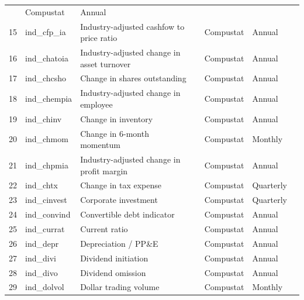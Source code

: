 \documentclass[11pt, a4paper, table]{article}
\begin{document}
\begin{landscape}
\begin{center}
\begin{longtable}{lllllll}
				\cite{desai_value-glamour_2004} & Compustat & Annual \\
			15 & ind\_cfp\_ia\footnotemark[\value{footnote}] & Industry-adjusted cashfow to price ratio & 
				\cite{asness_predicting_2000} & Compustat & Annual \\
			16 & ind\_chatoia\footnotemark[\value{footnote}] & Industry-adjusted change in asset turnover & 
				\cite{soliman_use_2008} & Compustat & Annual \\
			17 & ind\_chcsho & Change in shares outstanding & 
				\cite{pontiff_share_2008} & Compustat & Annual \\
			18 & ind\_chempia & Industry-adjusted change in employee & 
				\cite{asness_predicting_2000} & Compustat & Annual \\
			19 & ind\_chinv\footnotemark[\value{footnote}] & Change in inventory & 
				\cite{thomas_inventory_2002} & Compustat & Annual \\
			20 & ind\_chmom & Change in 6-month momentum & 
				\cite{gettleman_acceleration_2006} & Compustat & Monthly \\
			21 & ind\_chpmia\footnotemark[\value{footnote}] & Industry-adjusted change in profit margin & 
				\cite{soliman_use_2008} & Compustat & Annual \\
			22 & ind\_chtx & Change in tax expense & 
				\cite{thomas_tax_2011} & Compustat & Quarterly \\
			23 & ind\_cinvest & Corporate investment & 
				\cite{titman_capital_2004} & Compustat & Quarterly \\
			24 & ind\_convind & Convertible debt indicator & 
				\cite{valta_strategic_2016} & Compustat & Annual \\
			25 & ind\_currat & Current ratio & 
				\cite{ou_financial_1989} & Compustat & Annual \\
			26 & ind\_depr & Depreciation / PP\&E & 
				\cite{holthausen_prediction_1992} & Compustat & Annual \\
			27 & ind\_divi & Dividend initiation & 
				\cite{michaely_price_1995} & Compustat & Annual \\
			28 & ind\_divo & Dividend omission & 
				\cite{michaely_price_1995} & Compustat & Annual \\
			29 & ind\_dolvol & Dollar trading volume & 
				\cite{chordia_trading_2001} & Compustat & Monthly \\

\end{longtable}
\end{center}
\end{landscape}
\end{document}
